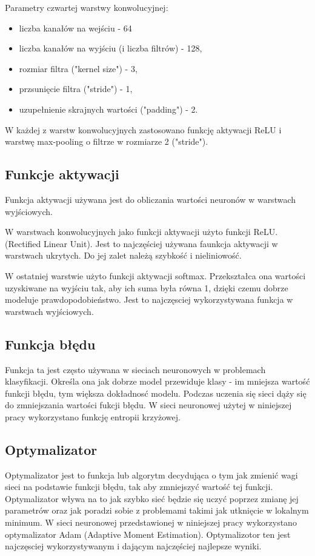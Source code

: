 \documentclass{sprz}
\begin{document}
Parametry czwartej warstwy konwolucyjnej:
\begin{itemize}
  \item{liczba kanałów na wejściu - 64}
  \item{liczba kanałów na wyjściu (i liczba filtrów) - 128,}
  \item{rozmiar filtra ("kernel size") - 3,}
  \item {przsunięcie filtra ("stride") - 1,}
  \item{uzupełnienie skrajnych wartości ("padding") - 2.}
\end{itemize}


W każdej z warstw konwolucyjnych zastosowano funkcję aktywacji ReLU i warstwę max-pooling o filtrze w rozmiarze 2 ("stride").

\subsection{Funkcje aktywacji}
Funkcja aktywacji używana jest do obliczania wartości neuronów w warstwach wyjściowych.

W warstwach konwolucyjnych jako funkcji aktywacji użyto funkcji ReLU. (Rectified Linear Unit). Jest to najczęściej używana faunkcja aktywacji w warstwach ukrytych. Do jej zalet należą szybkość i nieliniowość.

W ostatniej warstwie użyto funkcji aktywacji softmax. Przekształca ona wartości uzyskiwane na wyjściu tak, aby ich suma była równa 1, dzięki czemu dobrze modeluje prawdopodobieństwo. Jest to najczęsciej wykorzystywana funkcja w warstwach wyjściowych.

\subsection{Funkcja błędu}
Funkcja ta jest często używana w sieciach neuronowych w problemach klasyfikacji. Określa ona jak dobrze model przewiduje klasy - im mniejsza wartość funkcji błędu, tym większa dokładnosć modelu. Podczas uczenia się sieci dąży się do zmniejszania wartości fukcji błędu. W sieci neuronowej użytej w niniejszej pracy wykorzystano funkcję entropii krzyżowej.

\subsection{Optymalizator}
Optymalizator jest to funkcja lub algorytm decydująca o tym jak zmienić wagi sieci na podstawie funkcji błędu, tak aby zmniejszyć wartość tej funkcji. Optymalizator wływa na to jak szybko sieć będzie się uczyć poprzez zmianę jej parametrów oraz jak poradzi sobie z problemami takimi jak utknięcie w lokalnym minimum. W sieci neuronowej przedstawionej w niniejszej pracy wykorzystano optymalizator Adam (Adaptive Moment Estimation). Optymalizotor ten jest najczęsciej wykorzystywanym i dającym najczęściej najlepsze wyniki.
\end{document}

